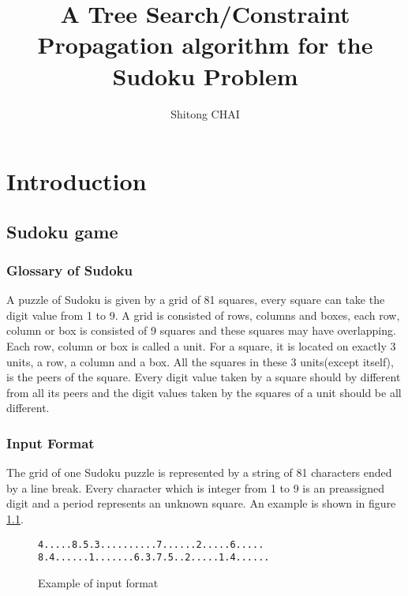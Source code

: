 \documentclass[a4paper, 12pt]{report}
\title{A Tree Search/Constraint Propagation algorithm for the Sudoku Problem}
\date{}
\author{Shitong CHAI}
\begin{document}
\maketitle
\tableofcontents

\chapter{Introduction}

    \section {Sudoku game}
        \subsection {Glossary of Sudoku}
            A puzzle of Sudoku is given by a grid of 81 squares, every square can take the digit value from 1 to 9. A grid is consisted of rows, columns and boxes, each row, column or box is consisted of 9 squares and these squares may have overlapping. Each row, column or box is called a unit. For a square, it is located on exactly 3 units, a row, a column and a box. All the squares in these 3 units(except itself), is the peers of the square. Every digit value taken by a square should by
            different from all its peers and the digit values taken by the squares of a unit should be all different.

        \subsection {Input Format}

            The grid of one Sudoku puzzle is represented by a string of 81 characters ended by a line break. Every character which is integer from 1 to 9 is an preassigned digit and a period represents an unknown square. An example is shown in figure \ref{examplesudoku}.
            \begin{figure}[H]
                \begin{lstlisting}[frame=single]
4.....8.5.3..........7......2.....6..... 8.4......1.......6.3.7.5..2.....1.4......
                \end{lstlisting}
                \label{examplesudoku}
                \caption{Example of input format}
            \end{figure}
\end{document}
